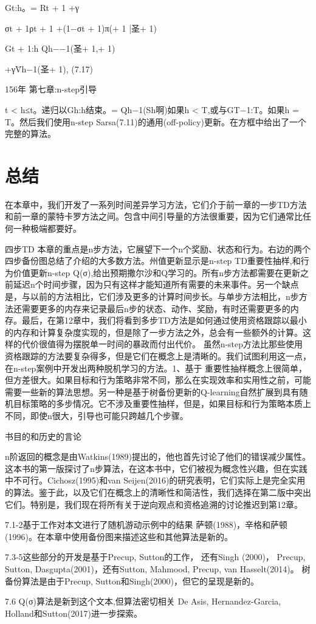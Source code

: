 Gt:h。= Rt + 1 +γ

σt + 1ρt + 1 +(1−σt + 1)π(+ 1 |圣+ 1)

Gt + 1:h Qh−−1(圣+ 1,+ 1)

+γV̄h−1(圣+ 1), 					(7.17)

156年 					第七章:n-step引导



t < h≤t。递归以Gh:h结束。= Qh−1(Sh啊)如果h < T,或与GT−1:T。如果h = T。然后我们使用n-step Sarsa(7.11)的通用(off-policy)更新。在方框中给出了一个完整的算法。
 \section{总结}

在本章中，我们开发了一系列时间差异学习方法，它们介于前一章的一步TD方法和前一章的蒙特卡罗方法之间。包含中间引导量的方法很重要，因为它们通常比任何一种极端都要好。



四步TD
本章的重点是n步方法，它展望下一个n个奖励、状态和行为。右边的两个四步备份图总结了介绍的大多数方法。州值更新显示是n-step TD重要性抽样,和行为价值更新n-step Q(σ),给出预期撒尔沙和Q学习的。所有n步方法都需要在更新之前延迟n个时间步骤，因为只有这样才能知道所有需要的未来事件。另一个缺点是，与以前的方法相比，它们涉及更多的计算时间步长。与单步方法相比，n步方法还需要更多的内存来记录最后n步的状态、动作、奖励，有时还需要更多的内存。最后，在第12章中，我们将看到多步TD方法是如何通过使用资格跟踪以最小的内存和计算复杂度实现的，但是除了一步方法之外，总会有一些额外的计算。这样的代价很值得为摆脱单一时间的暴政而付出代价。
虽然n-step方法比那些使用资格跟踪的方法要复杂得多，但是它们在概念上是清晰的。我们试图利用这一点，在n-step案例中开发出两种脱机学习的方法。1、基于
重要性抽样概念上很简单，但方差很大。如果目标和行为策略非常不同，那么在实现效率和实用性之前，可能需要一些新的算法思想。另一种是基于树备份更新的Q-learning自然扩展到具有随机目标策略的多步情况。它不涉及重要性抽样，但是，如果目标和行为策略本质上不同，即使n很大，引导也可能只跨越几个步骤。

书目的和历史的言论

n阶返回的概念是由Watkins(1989)提出的，他也首先讨论了他们的错误减少属性。这本书的第一版探讨了n步算法，在这本书中，它们被视为概念性兴趣，但在实践中不可行。Cichosz(1995)和van Seijen(2016)的研究表明，它们实际上是完全实用的算法。鉴于此，以及它们在概念上的清晰性和简洁性，我们选择在第二版中突出它们。特别是，我们现在将所有关于逆向观点和资格追溯的讨论推迟到第12章。

7.1-2基于工作对本文进行了随机游动示例中的结果
萨顿(1988)，辛格和萨顿(1996)。在本章中使用备份图来描述这些和其他算法是新的。

7.3-5这些部分的开发是基于Precup, Sutton的工作，
还有Singh (2000)， Precup, Sutton, Dasgupta(2001)，还有Sutton, Mahmood, Precup, van Hasselt(2014)。
树备份算法是由于Precup, Sutton和Singh(2000)，但它的呈现是新的。

7.6 Q(σ)算法是新到这个文本,但算法密切相关
De Asis, Hernandez-Garcia, Holland和Sutton(2017)进一步探索。

